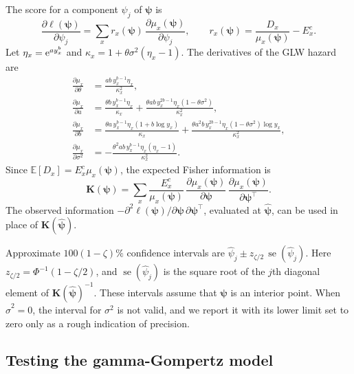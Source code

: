 \documentclass[12pt]{article}
\newcommand{\E}{\mathbb{E}}       %
\newcommand{\e}{{\rm e}}         %
\begin{document}
The score for a component $\psi_j$ of $\bm{\psi}$ is
\[
\frac{\partial \ell(\bm{\psi})}{\partial \psi_j}=\sum_{x}r_x(\bm{\psi})\,\frac{\partial\mu_x(\bm{\psi})}{\partial\psi_j},
\qquad
r_x(\bm{\psi})=\frac{D_x}{\mu_x(\bm{\psi})}-E^c_x.
\]
Let $\eta_x=\e^{ay_x^b}$ and $\kappa_x=1+\theta\sigma^2(\eta_x-1)$. The derivatives of the GLW hazard are
\begin{align*}
\frac{\partial \mu_x}{\partial \theta} &= \frac{a b\, y_x^{b-1}\eta_x}{\kappa_x^2}, \\
\frac{\partial \mu_x}{\partial a} &= \frac{\theta b\, y_x^{b-1}\eta_x}{\kappa_x} + \frac{\theta a b\, y_x^{2b - 1}\eta_x \left(1-\theta \sigma^2\right)}{\kappa_x^2}, \\
\frac{\partial \mu_x}{\partial b} &= \frac{\theta a\, y_x^{b-1} \eta_x \left(1 + b \log y_x\right)}{\kappa_x} + \frac{\theta a^2 b\, y_x^{2b - 1}\eta_x \left(1-\theta \sigma^2\right) \log y_x}{\kappa_x^2}, \\
\frac{\partial \mu_x}{\partial \sigma^2} &= -\frac{\theta^2 a b\, y_x^{b-1}\eta_x \left(\eta_x-1\right)}{\kappa_x^2}.
\end{align*}
Since $\E[D_x]=E^c_x\mu_x(\bm{\psi})$, the expected Fisher information is
\[
\bm{K}(\bm{\psi})=\sum_{x}\frac{E^c_x}{\mu_x(\bm{\psi})}\,\frac{\partial\mu_x(\bm{\psi})}{\partial\bm{\psi}}\,\frac{\partial\mu_x(\bm{\psi})}{\partial\bm{\psi}^\top}.
\]
The observed information $-\partial^2\ell(\bm{\psi})/\partial\bm{\psi}\,\partial\bm{\psi}^\top$, evaluated at $\hat{\bm{\psi}}$, can be used in place of $\bm{K}(\hat{\bm{\psi}})$.

Approximate $100(1 - \zeta)\%$ confidence intervals are $\hat{\psi}_j \pm z_{\zeta/2}\, \operatorname{se}(\hat{\psi}_j)$. Here $z_{\zeta/2} = \Phi^{-1}(1 - \zeta/2)$, and $\operatorname{se}(\hat{\psi}_j)$ is the square root of the $j$th diagonal element of $\bm{K}(\hat{\bm{\psi}})^{-1}$. These intervals assume that $\bm{\psi}$ is an interior point. When $\hat\sigma^2=0$, the interval for $\sigma^2$ is not valid, and we report it with its lower limit set to zero only as a rough indication of precision.

\subsection{Testing the gamma-Gompertz model}
\end{document}
